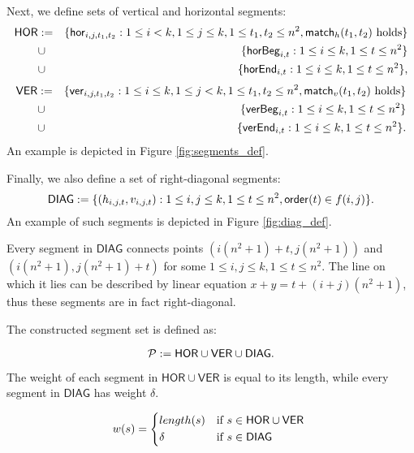 \newcommand{\allhor}{\mathsf{HOR}}
\newcommand{\allver}{\mathsf{VER}}
\newcommand{\alldiag}{\mathsf{DIAG}}

Next, we define sets of vertical and horizontal segments:
\begin{eqnarray*}
\allhor &:= &\{\hor{i}{j}{t_1}{t_2} : 1 \le i < k, 1 \le j \le k,
1 \le t_1, t_2 \le n^2, \matchh(t_1, t_2) \text{ holds}\} \\
&\cup &\{\horbeg{i}{t} : 1 \le i \le k, 1 \le t \le n^2\}
\\
&\cup &\{\horend{i}{t} : 1 \le i \le k, 1 \le t \le n^2\},
\end{eqnarray*}
\begin{eqnarray*}
\allver &:= &\{\ver{i}{j}{t_1}{t_2} : 1 \le i \le k, 1 \le j < k,
1 \le t_1, t_2 \le n^2, \matchv(t_1, t_2) \text{ holds}\} \\
&\cup &\{\verbeg{i}{t} : 1 \le i \le k, 1 \le t \le n^2\}
\\
&\cup &\{\verend{i}{t} : 1 \le i \le k, 1 \le t \le n^2\}.
\end{eqnarray*}
An example is depicted in Figure \ref{fig:segments_def}.

Finally, we also define a set of right-diagonal segments:
$$\alldiag := \{ (h_{i, j, t}, v_{i, j, t}) :
	1 \le i, j \le k, 1 \le t \le n^2, \order(t) \in f(i, j)\}.$$
An example of such segments is depicted in Figure \ref{fig:diag_def}.



Every segment in $\alldiag$
connects points $(i(n^2+1) + t, j(n^2+1))$
and $(i(n^2+1), j(n^2+1) + t)$
for some $1 \le i,j \le k, 1 \le t \le n^2$.
The line on which it lies can be described
by linear equation ${x+y=t+(i+j)(n^2+1)}$,
thus these segments are in fact right-diagonal.

The constructed segment set is defined as:

$$\sets := \allhor \cup \allver \cup \alldiag.$$

The weight of each segment in $\allhor \cup \allver$
is equal to its length,
while every segment in $\alldiag$ has weight
$\delta$.



\begin{equation}
w(s) =
	\begin{cases*}
	  length(s) 			& if $s \in \allhor \cup \allver$ \\
	  \delta        & if $s \in \alldiag$
	\end{cases*}
\end{equation}

